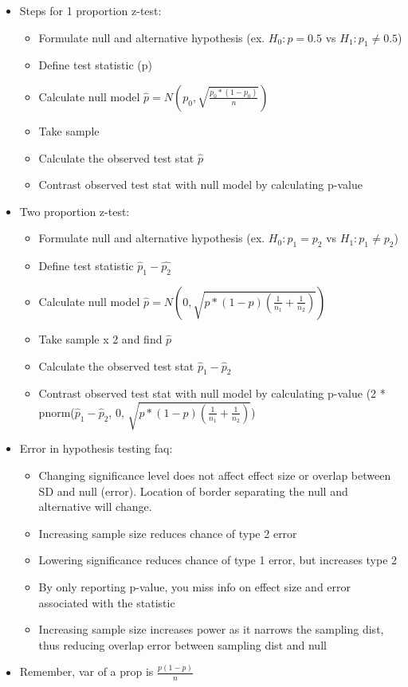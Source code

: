 \documentclass[8pt,landscape,a4paper, fleqn, dvipsnames]{extarticle}
\begin{document}
\begin{multicols*}{4}
\begin{itemize}
\begin{itemize}
    \item Steps for 1 proportion z-test:
    \begin{itemize}
        \item Formulate null and alternative hypothesis (ex. $H_0: p = 0.5$ vs $H_1: p_1 \neq 0.5$)
        \item Define test statistic (p)
        \item Calculate null model $\hat{p} = N(p_0, \sqrt{\frac{p_0*(1 - p_0)}{n}})$
        \item Take sample 
        \item Calculate the observed test stat $\hat{p}$
        \item Contrast observed test stat with null model by calculating p-value
    \end{itemize}
    \item Two proportion z-test:
    \begin{itemize}
        \item Formulate null and alternative hypothesis (ex. $H_0: p_1 = p_2$ vs $H_1: p_1 \neq p_2$)
        \item Define test statistic $\hat{p}_1 - \hat{p_2}$
        \item Calculate null model $\hat{p} = N(0, \sqrt{p*(1 - p)(\frac{1}{n_1} + \frac{1}{n_2})})$
        \item Take sample x 2 and find $\hat{p}$
        \item Calculate the observed test stat $\hat{p}_1 - \hat{p}_2$
        \item Contrast observed test stat with null model by calculating p-value (2 * pnorm($\hat{p}_1 - \hat{p}_2$, 0, $\sqrt{p*(1 - p)(\frac{1}{n_1} + \frac{1}{n_2})}$)
    \end{itemize}
    \item Error in hypothesis testing faq:
    \begin{itemize}
        \item Changing significance level does not affect effect size or overlap between SD and null (error). Location of border separating the null and alternative will change.
        \item Increasing sample size reduces chance of type 2 error
        \item Lowering significance reduces chance of type 1 error, but increases type 2
        \item By only reporting p-value, you miss info on effect size and error associated with the statistic
        \item Increasing sample size increases power as it narrows the sampling dist, thus reducing overlap error between sampling dist and null
    \end{itemize}
    \item Remember, var of a prop is $\frac{p(1-p)}{n}$
\end{itemize}
\end{itemize}
    
\end{multicols*}
\end{document}
